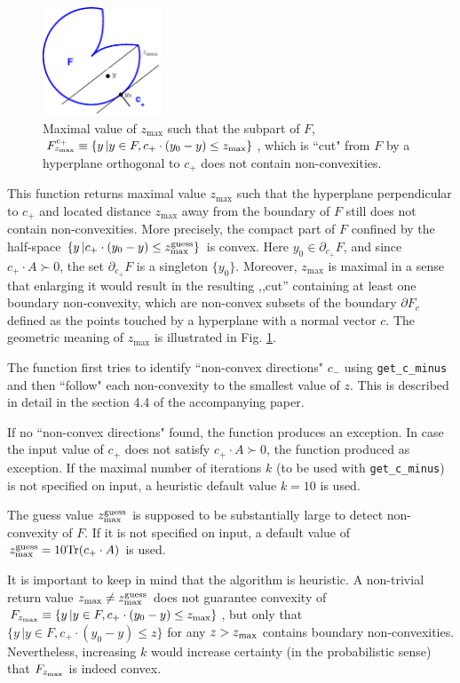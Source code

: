 \documentclass[a4paper]{article}
\theoremstyle{definition}
\begin{document}
\begin{enumerate}
\begin{figure}[H]
	\centering\includegraphics[width=100pt]{fig/get_z_max}
	\caption{Maximal value of $z_{\max}$ such that  the subpart of $F$, $F^{c_+}_{z_{\rm max}}\equiv \{y\, | y\in F, c_+ \cdot (y_0-y)\leq z_{\rm max}\}$, which is ``cut" from $F$ by a hyperplane orthogonal  to $c_+$ does not contain non-convexities.}
\label{fig:four}
\end{figure}


This function returns maximal value $z_{\max}$ such that the hyperplane perpendicular to $c_+$ and located distance $z_{\max}$ away from the boundary of $F$ still does not contain non-convexities.
More precisely, the compact part of $F$ confined by the half-space $\{y\, |c_+ \cdot (y_0-y)\leq z^{\rm guess}_{\rm max}\}$ is convex.
Here $y_0\in \partial_{c_+}F$, and since $c_+\cdot A\succ 0$, the set $\partial_{c_+}F$ is a singleton $\{y_0\}$.
Moreover, $z_{\max}$ is maximal in a sense that enlarging it would result in the resulting ,,cut'' containing at least one boundary non-convexity, which are non-convex subsets of the boundary $\partial F_c$ defined as the points touched by a hyperplane with a normal vector $c$.
The geometric meaning of $z_{\max}$ is illustrated in Fig. \ref{fig:four}. 

The function first tries to identify ``non-convex directions" $c_-$ using {\tt get\_c\_minus} and then ``follow" each non-convexity to the smallest value of $z$. This is described in detail in the section 4.4 of the accompanying paper.

If no ``non-convex directions" found, the function produces an exception.
In case the input value of $c_+$ does not satisfy $c_+\cdot A\succ 0$, the function produced as exception.
If the maximal number of iterations $k$ (to be used with {\tt get\_c\_minus}) is not specified on input, a heuristic default value $k=10$ is used.

The guess value $z^{\rm guess}_{\rm max}$ is supposed to be substantially large to detect non-convexity of $F$.
If it is not specified on input, a default value of $z^{\rm guess}_{\rm max}=10 {\rm Tr}(c_+\cdot A)$ is used.

It is important to keep in mind that the algorithm is heuristic.
A non-trivial return value $z_{\max}\neq z^{\rm guess}_{\rm max}$ does not guarantee convexity of  $F_{z_{\rm max}}\equiv \{y\, | y\in F, c_+ \cdot (y_0-y)\leq z_{\rm max}\}$, but only that $\{y\, | y\in F,c_+ \cdot (y_0-y)\leq z\}$ for any $z>z_{\rm max}$ contains boundary non-convexities.
Nevertheless, increasing $k$ would increase certainty (in the probabilistic sense) that $F_{z_{\rm max}}$ is indeed convex. 

\end{enumerate}
\end{document}
